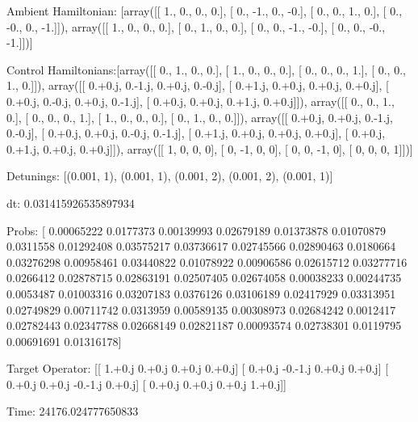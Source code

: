 \documentclass{article}
\begin{document}
    

\newpage

Ambient Hamiltonian: [array([[ 1.,  0.,  0.,  0.],
       [ 0., -1.,  0., -0.],
       [ 0.,  0.,  1.,  0.],
       [ 0., -0.,  0., -1.]]), array([[ 1.,  0.,  0.,  0.],
       [ 0.,  1.,  0.,  0.],
       [ 0.,  0., -1., -0.],
       [ 0.,  0., -0., -1.]])]

Control Hamiltonians:[array([[ 0.,  1.,  0.,  0.],
       [ 1.,  0.,  0.,  0.],
       [ 0.,  0.,  0.,  1.],
       [ 0.,  0.,  1.,  0.]]), array([[ 0.+0.j,  0.-1.j,  0.+0.j,  0.-0.j],
       [ 0.+1.j,  0.+0.j,  0.+0.j,  0.+0.j],
       [ 0.+0.j,  0.-0.j,  0.+0.j,  0.-1.j],
       [ 0.+0.j,  0.+0.j,  0.+1.j,  0.+0.j]]), array([[ 0.,  0.,  1.,  0.],
       [ 0.,  0.,  0.,  1.],
       [ 1.,  0.,  0.,  0.],
       [ 0.,  1.,  0.,  0.]]), array([[ 0.+0.j,  0.+0.j,  0.-1.j,  0.-0.j],
       [ 0.+0.j,  0.+0.j,  0.-0.j,  0.-1.j],
       [ 0.+1.j,  0.+0.j,  0.+0.j,  0.+0.j],
       [ 0.+0.j,  0.+1.j,  0.+0.j,  0.+0.j]]), array([[ 1,  0,  0,  0],
       [ 0, -1,  0,  0],
       [ 0,  0, -1,  0],
       [ 0,  0,  0,  1]])]

Detunings: [(0.001, 1), (0.001, 1), (0.001, 2), (0.001, 2), (0.001, 1)]

 dt: 0.031415926535897934

Probs: [ 0.00065222  0.0177373   0.00139993  0.02679189  0.01373878  0.01070879
  0.0311558   0.01292408  0.03575217  0.03736617  0.02745566  0.02890463
  0.0180664   0.03276298  0.00958461  0.03440822  0.01078922  0.00906586
  0.02615712  0.03277716  0.0266412   0.02878715  0.02863191  0.02507405
  0.02674058  0.00038233  0.00244735  0.0053487   0.01003316  0.03207183
  0.0376126   0.03106189  0.02417929  0.03313951  0.02749829  0.00711742
  0.0313959   0.00589135  0.00308973  0.02684242  0.0012417   0.02782443
  0.02347788  0.02668149  0.02821187  0.00093574  0.02738301  0.0119795
  0.00691691  0.01316178]

Target Operator: [[ 1.+0.j  0.+0.j  0.+0.j  0.+0.j]
 [ 0.+0.j -0.-1.j  0.+0.j  0.+0.j]
 [ 0.+0.j  0.+0.j -0.-1.j  0.+0.j]
 [ 0.+0.j  0.+0.j  0.+0.j  1.+0.j]]

Time: 24176.024777650833
\end{document}
